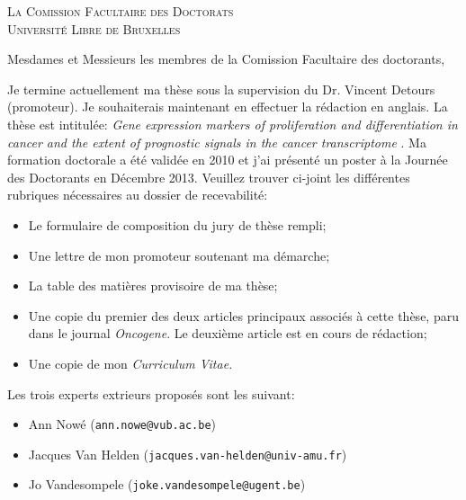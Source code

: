 \documentclass[12pt,origdate,origdate]{lettre}
\begin{document}
\begin{letter} {\textsc{La Comission Facultaire des Doctorats} \\
    \textsc{Université Libre de Bruxelles}}
  \thispagestyle{empty}
  \pagestyle{empty}
  \address{Gil \textsc{Tomás} \\
    \textsc{IRIBHM} \\ \textsc{Universit\'{e} Libre de Bruxelles} \\
    Campus Erasme---CP602 \\ B\^{a}timent \textsc{C}, salle C.4.110 \\
    808, route de Lennik \\ 1070 \textsc{Bruxelles}}
  \nofax

  \opening{Mesdames et Messieurs les membres de la Comission
    Facultaire des doctorants,}

  Je termine actuellement ma thèse sous la supervision du Dr. Vincent Detours
  (promoteur). Je souhaiterais maintenant en effectuer la rédaction en anglais.
  La thèse est intitulée: \og \emph{Gene expression markers of proliferation and
    differentiation in cancer and the extent of prognostic signals in the cancer
    transcriptome} \fg. Ma formation doctorale a été validée en 2010 et j'ai
  présenté un poster à la Journée des Doctorants en Décembre 2013.
  Veuillez trouver ci-joint les différentes rubriques nécessaires au dossier de
  recevabilité:

\begin{itemize}
  \item Le formulaire de composition du jury de thèse rempli;
  \item Une lettre de mon promoteur soutenant ma démarche;
  \item La table des matières provisoire de ma thèse;
  \item Une copie du premier des deux articles principaux associés à cette
    thèse, paru dans le journal \emph{Oncogene}. Le deuxième article
    est en cours de rédaction;
  \item Une copie de mon \emph{Curriculum Vitae.}
  \end{itemize}

Les trois experts extrieurs proposés sont les suivant:

\begin{itemize}
  \item Ann Nowé (\texttt{ann.nowe@vub.ac.be})
  \item Jacques Van Helden (\texttt{jacques.van-helden@univ-amu.fr})
  \item Jo Vandesompele (\texttt{joke.vandesompele@ugent.be})
  \end{itemize}


\end{letter}
\end{document}
